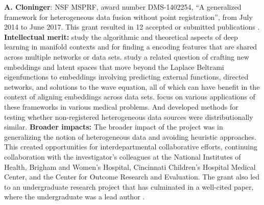 {\bf A. Cloninger}: NSF MSPRF, award number DMS-1402254, ``A generalized framework for heterogeneous data fusion without point registration'', from July 2014 to June 2017. This grant resulted in 12 accepted or submitted publications \cite{}.
{\bf Intellectual merit:} \cite{mishne2017diffusion,cloninger2018bigeometric,shaham2018provable} study the algorithmic and theoretical aspects of deep learning in manifold contexts and for finding a encoding features that are shared across multiple networks or data sets.  \cite{cloninger2017spectral, cloninger2017note, cloninger2017prediction} study a related question of crafting new embeddings and latent spaces that move beyond the Laplace Beltrami eigenfunctions to embeddings involving predicting external functions, directed networks, and solutions to the wave equation, all of which can have benefit in the context of aligning embeddings across data sets.  \cite{cloninger2016function, downing2017describing, bates2017outcome, katzman2018deepsurv} focus on various applications of these frameworks in various medical problems.  And \cite{cheng2017two,cloninger2018people} developed methods for testing whether non-registered heterogeneous data sources were distributionally similar.
{\bf Broader impacts:}
The broader impact of the project was in generalizing the notion of heterogeneous data and avoiding heuristic approaches.  This created opportunities for interdepartmental collaborative efforts, continuing collaboration with the investigator's colleagues at the National Institutes of Health, Brigham and Women's Hospital, Cincinnati Children's Hospital Medical Center, and the Center for Outcome Research and Evaluation.  The grant also led to an undergraduate research project that has culminated in a well-cited paper, where the undergraduate was a lead author \cite{katzman2016deep}.


